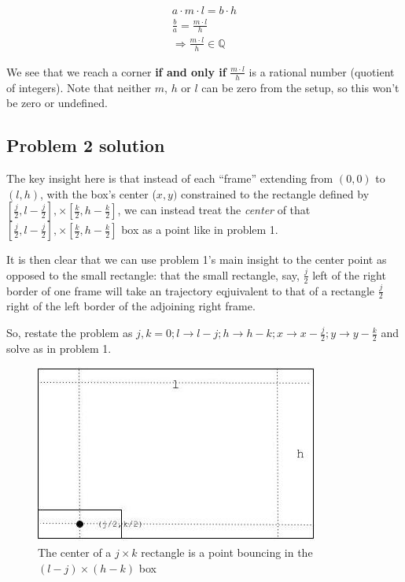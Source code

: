 \documentclass[11pt, oneside]{article} 	%
\begin{document}
\begin{align}
a \cdot m \cdot l = b \cdot h \\
\frac{b}{a} = \frac{m \cdot l}{h} \\ 
\Rightarrow \frac{m \cdot l}{h} \in \mathbb{Q} 
\end{align}

We see that we reach a corner \textbf{if and only if} $\frac{m \cdot l}{h}$ is a rational number (quotient of integers).  Note that neither $m$, $h$ or $l$ can be zero from the setup, so this won't be zero or undefined.



\subsection{Problem 2 solution}

The key insight here is that instead of each ``frame'' extending from $(0, 0)$ to $(l, h)$, with the box's center ($x, y)$ constrained to the rectangle defined by $[\frac{j}{2}, l - \frac{j}{2}], \times [\frac{k}{2}, h - \frac{k}{2}]$, we can instead treat the \emph{center} of that $[\frac{j}{2}, l - \frac{j}{2}], \times [\frac{k}{2}, h - \frac{k}{2}]$ box as a point like in problem 1. 

It is then clear that we can use problem 1's main insight to the center point as opposed to the small rectangle: that the small rectangle, say, $\frac{j}{2}$ left of the right border of one frame will take an trajectory eqjuivalent to that of a rectangle $\frac{j}{2}$ right of the left border of the adjoining right frame.

So, restate the problem as $j, k = 0; l \rightarrow l - j; h \rightarrow h - k;  x \rightarrow x - \frac{j}{2}; y \rightarrow y - \frac{k}{2}$ and solve as in problem 1.

\begin{figure}[!htb]
\centering
\includegraphics[scale=.4]{problem2}
\caption{The center of a $j \times k$ rectangle is a point bouncing in the $(l - j) \times (h - k)$ box}
\end{figure}
\end{document}
